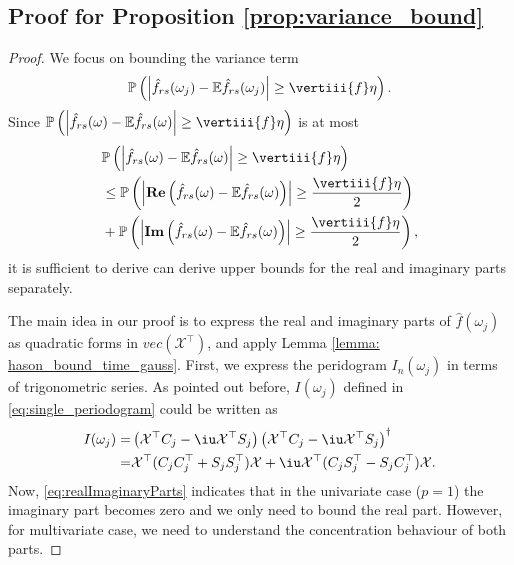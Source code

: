 \subsection{Proof for Proposition \ref{prop:variance_bound}}
\begin{proof}
We focus on bounding the variance term
\begin{equation}
\mathbb{P}\left(\left|\hat{f}_{rs}(\omega_j) - \mathbb{E}\hat{f}_{rs}(\omega_j)\right| \ge \vertiii{f}\eta\right).
\end{equation}
Since $\mathbb{P}\left(\left|\hat{f}_{rs}(\omega) - \mathbb{E}\hat{f}_{rs}(\omega)\right|\ge  \vertiii{f}\eta \right)$ is at most 
\begin{equation}
\label{eq:bound_with_real_img}
\begin{aligned}
&\mathbb{P}\left(\left|\hat{f}_{rs}(\omega) - \mathbb{E}\hat{f}_{rs}(\omega)\right|\ge  \vertiii{f}\eta \right) \\
&\le \mathbb{P}\left(\left|\mathbf{Re}\left(\hat{f}_{rs}(\omega) - \mathbb{E}\hat{f}_{rs}(\omega)\right)\right|\ge \frac{\vertiii{f}\eta}{2} \right) \\
& + \mathbb{P}\left(\left|\mathbf{Im}\left(\hat{f}_{rs}(\omega) - \mathbb{E}\hat{f}_{rs}(\omega)\right)\right|\ge \frac{\vertiii{f}\eta}{2} \right),
\end{aligned}
\end{equation}
it is sufficient to derive can derive upper bounds for the real and imaginary parts separately.\par 
The main idea in our proof is to express the real and imaginary parts of $\hat{f}(\omega_j)$ as quadratic forms in $vec(\mathcal{X}^\top)$, and apply Lemma \ref{lemma: hason_bound_time_gauss}. 
First, we express the peridogram $I_n(\omega_j)$ in terms of  trigonometric series. 
As pointed out before, $I(\omega_j)$ defined in \eqref{eq:single_periodogram} could be written as 
\begin{equation}
\label{eq:realImaginaryParts}
\begin{aligned}
I(\omega_j) = & \left(\mathcal{X}^\top C_j-  \iu \mathcal{X}^\top S_j\right) \left(\mathcal{X}^\top C_j-\iu \mathcal{X}^\top S_j\right)^\dag \\
= & \mathcal{X}^\top (C_jC_j^\top + S_jS_j^\top)\mathcal{X} + \iu \mathcal{X}^\top(C_jS_j^\top-S_jC_j^\top)\mathcal{X}.
\end{aligned}
\end{equation}
Now, \eqref{eq:realImaginaryParts} indicates that in the univariate case ($p=1$) the imaginary part becomes zero and we only need to bound the real part. However, for multivariate case, we need to understand the concentration behaviour of both parts. \par 

\end{proof}
